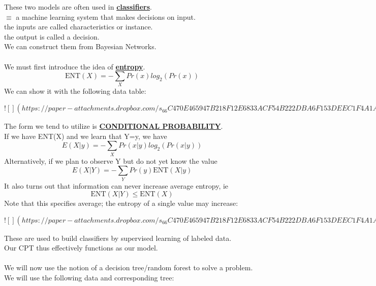\documentclass[../../lecture_notes.tex]{subfiles}
\begin{document}
\noindent These two models are often used in \textbf{\underline{classifiers}}.\\
\indent $\equiv$ a machine learning system that makes decisions on input.\\
	\indent \indent the inputs are called characteristics or instance.\\
	\indent \indent the output is called a decision.\\
We can construct them from Bayesian Networks.\\
\\
We must first introduce the idea of \textbf{\underline{entropy}}.
	\begin{equation*} \text{ENT}(X) = -\sum_X Pr(x) log_2{(Pr(x))} \end{equation*}
We can show it with the following data table:

\newpage
$![](https://paper-attachments.dropbox.com/s_66C470E465947B218F12E6833ACF54B222DBA6F153DEEC1F4A1A4D06909A7A0F_1590913272078_Untitled+drawing+10.jpg)$
\newpage

\noindent The form we tend to utilize is \textbf{\underline{CONDITIONAL PROBABILITY}}.\\
If we have ENT(X) and we learn that Y=y, we have 
	\begin{equation*} E(X|y) = - \sum_X Pr(x|y) log_2{(Pr(x|y))} \end{equation*}
Alternatively, if we plan to observe Y but do not yet know the value
	\begin{equation*} E(X|Y) = - \sum_Y Pr(y) \text{ENT}(X|y) \end{equation*}
It also turns out that information can never increase average entropy, ie
	\begin{equation*} \text{ENT}(X|Y) \leq \text{ENT}(X) \end{equation*}
Note that this specifies average; the entropy of a single value may increase:

\newpage
$![](https://paper-attachments.dropbox.com/s_66C470E465947B218F12E6833ACF54B222DBA6F153DEEC1F4A1A4D06909A7A0F_1590913804777_Untitled+drawing+11.jpg)$
\newpage

\noindent These are used to build classifiers by supervised learning of labeled data.\\
Our CPT thus effectively functions as our model.\\
\\
We will now use the notion of a decision tree/random forest to solve a problem.\\
We will use the following data and corresponding tree:
\end{document}

